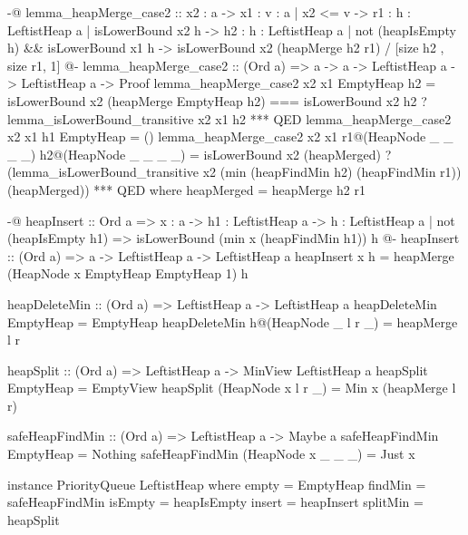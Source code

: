 \begin{code}[caption={Leftist Heap}, label={lst:leftist-heap}]
{-@ lemma_heapMerge_case2 :: x2 : a -> x1 : { v : a |  x2  <= v} -> r1 : {h : LeftistHeap a | isLowerBound x2 h} -> h2 : {h : LeftistHeap a | not (heapIsEmpty h) && isLowerBound x1 h}  -> {isLowerBound x2 (heapMerge h2 r1)} / [size h2 , size r1, 1] @-}
lemma_heapMerge_case2 :: (Ord a) => a -> a -> LeftistHeap a -> LeftistHeap a -> Proof
lemma_heapMerge_case2 x2 x1 EmptyHeap h2 =
  isLowerBound x2 (heapMerge EmptyHeap h2)
    === isLowerBound x2 h2
    ? lemma_isLowerBound_transitive x2 x1 h2
    *** QED
lemma_heapMerge_case2 x2 x1 h1 EmptyHeap = ()
lemma_heapMerge_case2 x2 x1 r1@(HeapNode _ _ _ _) h2@(HeapNode _ _ _ _) =
  isLowerBound x2 (heapMerged)
    ? (lemma_isLowerBound_transitive x2 (min (heapFindMin h2) (heapFindMin r1)) (heapMerged))
    *** QED
 where
  heapMerged = heapMerge h2 r1

{-@ heapInsert :: Ord a => x : a -> h1 : LeftistHeap a -> {h : LeftistHeap a | not (heapIsEmpty h1) => isLowerBound (min x (heapFindMin h1)) h} @-}
heapInsert :: (Ord a) => a -> LeftistHeap a -> LeftistHeap a
heapInsert x h = heapMerge (HeapNode x EmptyHeap EmptyHeap 1) h

heapDeleteMin :: (Ord a) => LeftistHeap a -> LeftistHeap a
heapDeleteMin EmptyHeap = EmptyHeap
heapDeleteMin h@(HeapNode _ l r _) = heapMerge l r

heapSplit :: (Ord a) => LeftistHeap a -> MinView LeftistHeap a
heapSplit EmptyHeap = EmptyView
heapSplit (HeapNode x l r _) = Min x (heapMerge l r)

safeHeapFindMin :: (Ord a) => LeftistHeap a -> Maybe a
safeHeapFindMin EmptyHeap = Nothing
safeHeapFindMin (HeapNode x _ _ _) = Just x

instance PriorityQueue LeftistHeap where
  empty = EmptyHeap
  findMin = safeHeapFindMin
  isEmpty = heapIsEmpty
  insert = heapInsert
  splitMin = heapSplit
\end{code}


